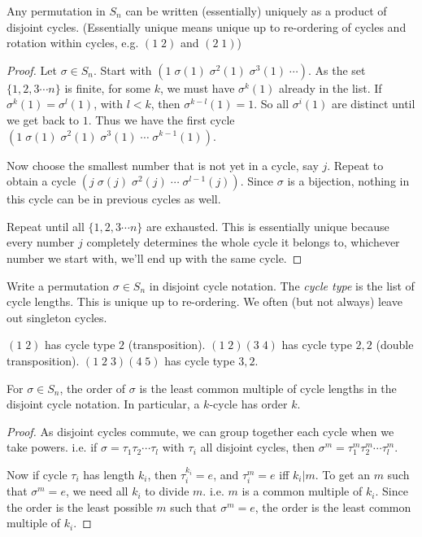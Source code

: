 \documentclass[a4paper]{article}
\begin{document}
  \begin{thm}
    Any permutation in $S_n$ can be written (essentially) uniquely as a product of disjoint cycles. (Essentially unique means unique up to re-ordering of cycles and rotation within cycles, e.g. $(1\; 2)$ and $(2\; 1)$)
  \end{thm}

  \begin{proof}
    Let $\sigma\in S_n$. Start with $(1\; \sigma(1)\; \sigma^2(1)\; \sigma^3(1)\;\cdots)$. As the set $\{1, 2, 3\cdots n\}$ is finite, for some $k$, we must have $\sigma^k(1)$ already in the list. If $\sigma^k(1) = \sigma^l(1)$, with $l < k$, then $\sigma^{k-l}(1) = 1$. So all $\sigma^i(1)$ are distinct until we get back to $1$. Thus we have the first cycle $(1\; \sigma(1)\; \sigma^2(1)\; \sigma^3(1)\;\cdots\;\sigma^{k-1}(1))$.

    Now choose the smallest number that is not yet in a cycle, say $j$. Repeat to obtain a cycle $(j\; \sigma(j)\; \sigma^2(j)\;\cdots\; \sigma^{l - 1}(j))$. Since $\sigma$ is a bijection, nothing in this cycle can be in previous cycles as well.

    Repeat until all $\{1, 2, 3\cdots n\}$ are exhausted. This is essentially unique because every number $j$ completely determines the whole cycle it belongs to, whichever number we start with, we'll end up with the same cycle.
  \end{proof}

  \begin{defi}
    Write a permutation $\sigma\in S_n$ in disjoint cycle notation. The \emph{cycle type} is the list of cycle lengths. This is unique up to re-ordering. We often (but not always) leave out singleton cycles.
  \end{defi}
  \begin{eg}
    $(1\; 2)$ has cycle type $2$ (transposition). $(1\; 2)(3\; 4)$ has cycle type $2, 2$ (double transposition). $(1\; 2\; 3)(4\; 5)$ has cycle type $3, 2$.
  \end{eg}
  \begin{lemma}
    For $\sigma\in S_n$, the order of $\sigma$ is the least common multiple of cycle lengths in the disjoint cycle notation. In particular, a $k$-cycle has order $k$.
  \end{lemma}

  \begin{proof}
    As disjoint cycles commute, we can group together each cycle when we take powers. i.e. if $\sigma = \tau_1\tau_2\cdots\tau_l$ with $\tau_i$ all disjoint cycles, then $\sigma^m = \tau_1^m\tau_2^m\cdots\tau_l^m$.

    Now if cycle $\tau_i$ has length $k_i$, then $\tau_i^{k_i} = e$, and $\tau_i^m = e$ iff $k_i | m$. To get an $m$ such that $\sigma^m = e$, we need all $k_i$ to divide $m$. i.e. $m$ is a common multiple of $k_i$. Since the order is the least possible $m$ such that $\sigma^m = e$, the order is the least common multiple of $k_i$.
  \end{proof}
\end{document}
